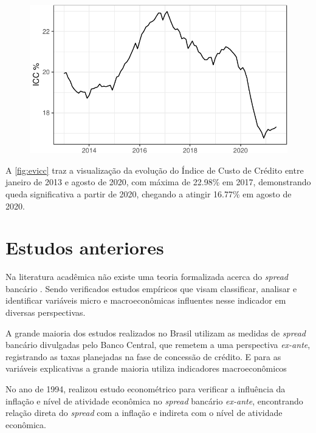 \documentclass[12pt,12pt,openright,oneside,a4paper,chapter=TITLE,section=TITLE,subsection=TITLE,subsubsection=TITLE,english,french,spanish,portugues,sumario=tradicional]{abntex2}
\begin{document}
\begin{figure}

\begin{center}\includegraphics{12-exportedfigures/ICC-1} \end{center}
\label{fig:evicc}
\end{figure}

A \autoref{fig:evicc} traz a visualização da evolução do Índice de Custo de
Crédito entre janeiro de 2013 e agosto de 2020, com máxima de 22.98\% em
2017, demonstrando queda significativa a partir de 2020, chegando a atingir 16.77\% em agosto de 2020.

\section{Estudos anteriores}

Na literatura acadêmica não existe uma teoria formalizada acerca do \emph{spread}
bancário \cite{timotio:2018}. Sendo verificados estudos empíricos que visam
classificar, analisar e identificar variáveis micro e macroeconômicas
influentes nesse indicador em diversas perspectivas.

A grande maioria dos estudos realizados no Brasil utilizam as medidas de
\emph{spread} bancário divulgadas pelo Banco Central, que remetem a uma perspectiva
\emph{ex-ante}, registrando as taxas planejadas na fase de concessão de crédito. E
para as variáveis explicativas a grande maioria utiliza indicadores
macroeconômicos \cite{dantas:2012}

No ano de 1994, \textcite{aronovich:1994} realizou estudo econométrico para
verificar a influência da inflação e nível de atividade econômica no \emph{spread}
bancário \emph{ex-ante}, encontrando relação direta do \emph{spread} com a inflação e
indireta com o nível de atividade econômica.
\end{document}
